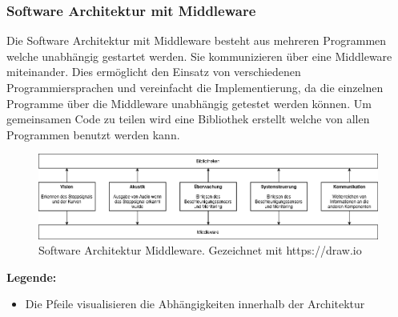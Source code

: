 \documentclass[../../main.tex]{subfiles}
\begin{document}
\subsubsection{Software Architektur mit Middleware}
Die Software Architektur mit Middleware besteht aus mehreren Programmen welche unabhängig gestartet werden.
Sie kommunizieren über eine Middleware miteinander.
Dies ermöglicht den Einsatz von verschiedenen Programmiersprachen und vereinfacht die Implementierung,
da die einzelnen Programme über die Middleware unabhängig getestet werden können.
Um gemeinsamen Code zu teilen wird eine Bibliothek erstellt welche von allen Programmen benutzt werden kann.

\begin{figure}[H] %
    \centering
    \includegraphics[width=1.0\textwidth]{../../drawings/ArchitekturDiagramm/SW_Architektur_Middleware.png}
    \caption {Software Architektur Middleware. Gezeichnet mit https://draw.io}
\end{figure}

\textbf{Legende:}
\begin{itemize}
    \item Die Pfeile visualisieren die Abhängigkeiten innerhalb der Architektur
\end{itemize}
\end{document}
